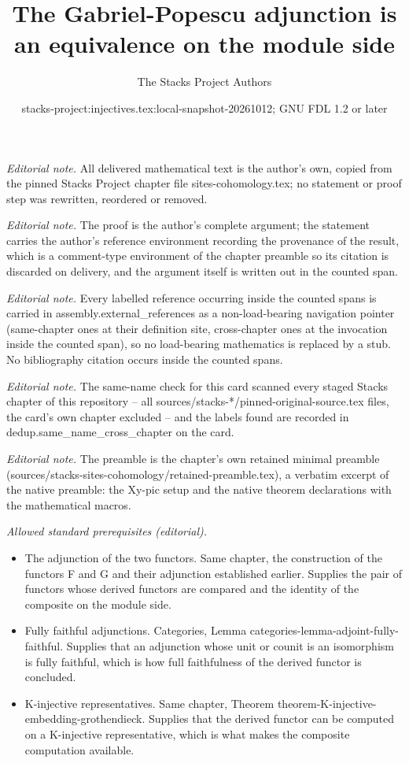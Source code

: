 \documentclass[10pt,a4paper]{amsart}
\title{The Gabriel-Popescu adjunction is an equivalence on the module side}
\author{The Stacks Project Authors}
\date{stacks-project:injectives.tex:local-snapshot-20261012; GNU FDL 1.2 or later}
\theoremstyle{plain}
\theoremstyle{definition}
\theoremstyle{remark}
\numberwithin{equation}{subsection}
\begin{document}
\maketitle
\noindent\textit{Editorial note.} All delivered mathematical text is the author's own, copied from the pinned Stacks Project chapter file sites-cohomology.tex; no statement or proof step was rewritten, reordered or removed.\par\medskip
\noindent\textit{Editorial note.} The proof is the author's complete argument; the statement carries the author's reference environment recording the provenance of the result, which is a comment-type environment of the chapter preamble so its citation is discarded on delivery, and the argument itself is written out in the counted span.\par\medskip
\noindent\textit{Editorial note.} Every labelled reference occurring inside the counted spans is carried in assembly.external\_references as a non-load-bearing navigation pointer (same-chapter ones at their definition site, cross-chapter ones at the invocation inside the counted span), so no load-bearing mathematics is replaced by a stub. No bibliography citation occurs inside the counted spans.\par\medskip
\noindent\textit{Editorial note.} The same-name check for this card scanned every staged Stacks chapter of this repository -- all sources/stacks-*/pinned-original-source.tex files, the card's own chapter excluded -- and the labels found are recorded in dedup.same\_name\_cross\_chapter on the card.\par\medskip
\noindent\textit{Editorial note.} The preamble is the chapter's own retained minimal preamble (sources/stacks-sites-cohomology/retained-preamble.tex), a verbatim excerpt of the native preamble: the Xy-pic setup and the native theorem declarations with the mathematical macros.\par\medskip
\noindent\textit{Allowed standard prerequisites (editorial).}\begin{itemize}
\item The adjunction of the two functors. Same chapter, the construction of the functors F and G and their adjunction established earlier. Supplies the pair of functors whose derived functors are compared and the identity of the composite on the module side.
\item Fully faithful adjunctions. Categories, Lemma categories-lemma-adjoint-fully-faithful. Supplies that an adjunction whose unit or counit is an isomorphism is fully faithful, which is how full faithfulness of the derived functor is concluded.
\item K-injective representatives. Same chapter, Theorem theorem-K-injective-embedding-grothendieck. Supplies that the derived functor can be computed on a K-injective representative, which is what makes the composite computation available.
\end{itemize}\medskip
\end{document}
